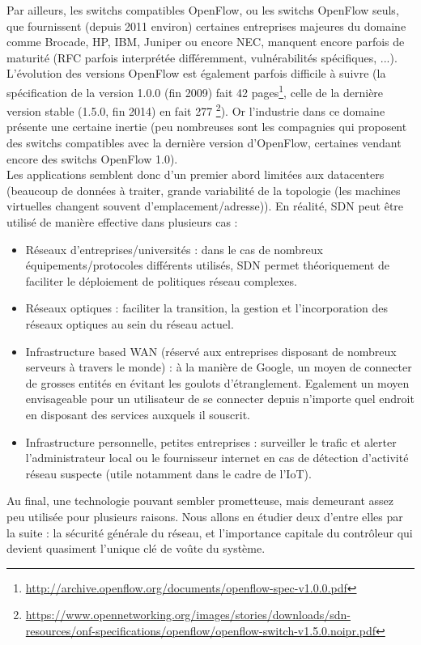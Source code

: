 Par ailleurs, les switchs compatibles OpenFlow, ou les switchs OpenFlow seuls, que fournissent (depuis 2011 environ) certaines entreprises majeures du domaine comme Brocade, HP, IBM, Juniper ou encore NEC, manquent encore parfois de maturité (RFC parfois interprétée différemment, vulnérabilités spécifiques, ...). L'évolution des versions OpenFlow est également parfois difficile à suivre (la spécification de la version 1.0.0 (fin 2009) fait 42 pages\footnote{\label{OF_10}\url{http://archive.openflow.org/documents/openflow-spec-v1.0.0.pdf}}, celle de la dernière version stable (1.5.0, fin 2014) en fait 277 \footnote{\url{https://www.opennetworking.org/images/stories/downloads/sdn-resources/onf-specifications/openflow/openflow-switch-v1.5.0.noipr.pdf}}). Or l'industrie dans ce domaine présente une certaine inertie (peu nombreuses sont les compagnies qui proposent des switchs compatibles avec la dernière version d'OpenFlow, certaines vendant encore des switchs OpenFlow 1.0).\\

Les applications semblent donc d'un premier abord limitées aux datacenters (beaucoup de données à traiter, grande variabilité de la topologie (les machines virtuelles changent souvent d'emplacement/adresse)). En réalité, SDN peut être utilisé de manière effective dans plusieurs cas :

\begin{itemize}
\item Réseaux d'entreprises/universités : dans le cas de nombreux équipements/protocoles différents utilisés, SDN permet théoriquement de faciliter le déploiement de politiques réseau complexes.
\item Réseaux optiques : faciliter la transition, la gestion et l'incorporation des réseaux optiques au sein du réseau actuel.
\item Infrastructure based WAN (réservé aux entreprises disposant de nombreux serveurs à travers le monde) : à la manière de Google, un moyen de connecter de grosses entités en évitant les goulots d'étranglement. Egalement un moyen envisageable pour un utilisateur de se connecter depuis n'importe quel endroit en disposant des services auxquels il souscrit.
\item Infrastructure personnelle, petites entreprises : surveiller le trafic et alerter l'administrateur local ou le fournisseur internet en cas de détection d'activité réseau suspecte (utile notamment dans le cadre de l'IoT).\\
\end{itemize}

Au final, une technologie pouvant sembler prometteuse, mais demeurant assez peu utilisée pour plusieurs raisons. Nous allons en étudier deux d'entre elles par la suite : la sécurité générale du réseau, et l'importance capitale du contrôleur qui devient quasiment l'unique clé de voûte du système.